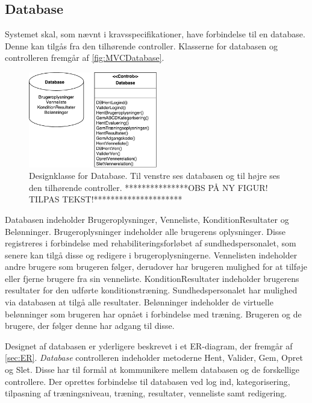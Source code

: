\subsection*{Database} \label{sec:databaseDesign}
Systemet skal, som nævnt i kravsspecifikationer, have forbindelse til en database. Denne kan tilgås fra den tilhørende controller. Klasserne for databasen og controlleren fremgår af \autoref{fig:MVCDatabase}. 

\begin{figure} [H]
\centering
\includegraphics[width=0.5\textwidth]{figures/MVC/MVCDatabase}
\caption{Designklasse for Database. Til venstre ses databasen og til højre ses den tilhørende controller. ***************OBS PÅ NY FIGUR! TILPAS TEKST!*********************}
\label{fig:MVCDatabase}
\end{figure}

\noindent
Databasen indeholder Brugeroplysninger, Venneliste, KonditionResultater og Belønninger. Brugeroplysninger indeholder alle brugerens oplysninger. Disse registreres i forbindelse med rehabiliteringsforløbet af sundhedspersonalet, som senere kan tilgå disse og redigere i brugeroplysningerne. Vennelisten indeholder andre brugere som brugeren følger, derudover har brugeren mulighed for at tilføje eller fjerne brugere fra sin venneliste. KonditionResultater indeholder brugerens resultater for den udførte konditionstræning. Sundhedspersonalet har mulighed via databasen at tilgå alle resultater. Belønninger indeholder de virtuelle belønninger som brugeren har opnået i forbindelse med træning. Brugeren og de brugere, der følger denne har adgang til disse.  

Designet af databasen er yderligere beskrevet i et ER-diagram, der fremgår af \autoref{sec:ER}. \textit{Database} controlleren indeholder metoderne Hent, Valider, Gem, Opret og Slet. Disse har til formål at kommunikere mellem databasen og de forskellige controllere. Der oprettes forbindelse til databasen ved log ind, kategorisering, tilpasning af træningsniveau, træning, resultater, venneliste samt redigering. 

